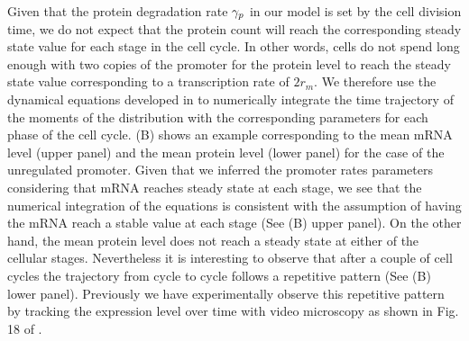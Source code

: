 Given that the protein degradation rate $\gamma _p$ in our model is set by the cell
division time, we do not expect that the protein count will reach the
corresponding steady state value for each stage in the cell cycle. In other
words, cells do not spend long enough with two copies of the promoter for the
protein level to reach the steady state value corresponding to a transcription
rate of $2 r_m$. We therefore use the dynamical equations developed in
 to numerically integrate the time trajectory of the
moments of the distribution with the corresponding parameters for each phase of
the cell cycle. (B) shows an example corresponding to the
mean mRNA level (upper panel) and the mean protein level (lower panel) for the
case of the unregulated promoter. Given that we inferred the promoter rates
parameters considering that mRNA reaches steady state at each stage, we see
that the numerical integration of the equations is consistent with the
assumption of having the mRNA reach a stable value at each stage (See
(B) upper panel). On the other hand, the mean protein
level does not reach a steady state at either of the cellular stages.
Nevertheless it is interesting to observe that after a couple of cell cycles
the trajectory from cycle to cycle follows a repetitive pattern (See
(B) lower panel). Previously we have experimentally
observe this repetitive pattern by tracking the expression level over time with
video microscopy as shown in Fig. 18 of \cite{Phillips2019}.

